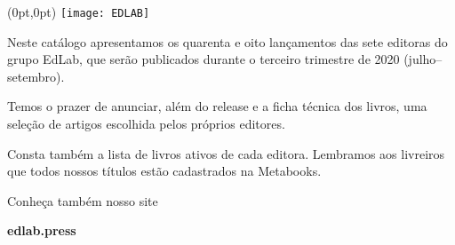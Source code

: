\begin{textblock*}{5.625in}(0pt,0pt)%
\vspace*{-2.4cm}
\hspace*{-2.1cm}\texttt{[image: EDLAB]}
\end{textblock*}

\pagebreak

\pagestyle{indice}

{}

\vspace{1.2cm}

{}


\hspace*{-7cm}\hrulefill\hspace*{-7cm}

\vspace{1cm}

\hspace*{-.5cm}\parbox{180pt}{\raggedright 
Neste catálogo apresentamos os quarenta e oito
lançamentos das sete editoras do grupo EdLab, que serão publicados durante o
terceiro trimestre de 2020 (julho--setembro). 

Temos o prazer de anunciar, além do release e a ficha técnica dos livros, uma 
seleção de artigos escolhida pelos próprios editores. 

Consta também a lista de 
livros ativos de cada editora. Lembramos aos livreiros que todos nossos títulos
estão cadastrados na Metabooks.

Conheça também nosso site

{\Formular\textbf{edlab.press}}
} %

